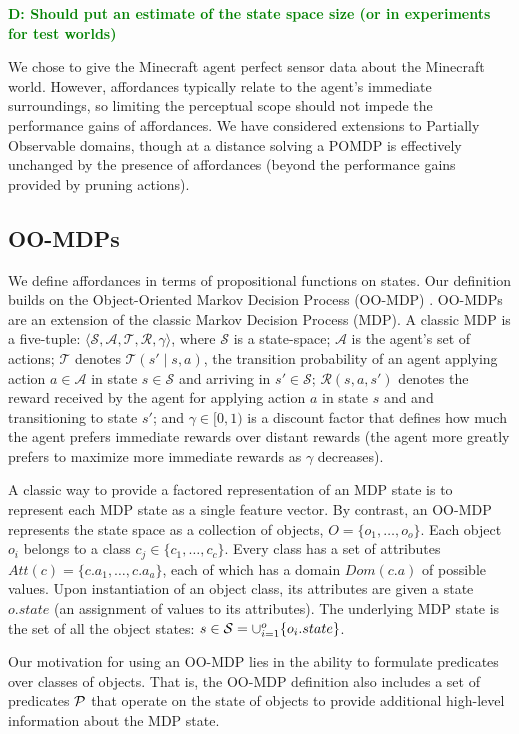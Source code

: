 \documentclass[conference]{IEEEtran}
\newcommand{\dnote}[1]{\textcolor{Green}{\textbf{D: #1}}}
\begin{document}
\dnote{Should put an estimate of the state space size (or in experiments for test worlds)}

We chose to give the Minecraft agent perfect sensor data about the Minecraft world.
However, affordances typically relate to the agent's immediate surroundings,
so limiting the perceptual scope should not impede the performance gains of affordances.
We have considered extensions to Partially Observable domains, though at a distance
solving a POMDP is effectively unchanged by the presence of affordances (beyond the
performance gains provided by pruning actions).

\subsection{OO-MDPs}

We define affordances in terms of propositional functions on states. Our definition builds on the Object-Oriented Markov Decision Process
(OO-MDP) \cite{diuk08}.  OO-MDPs are an extension of
the classic Markov Decision Process (MDP).  A classic MDP is a
five-tuple: $\langle \mathcal{S}, \mathcal{A}, \mathcal{T},
\mathcal{R}, \gamma \rangle$, where $\mathcal{S}$ is a state-space;
$\mathcal{A}$ is the agent's set of actions; $\mathcal{T}$ denotes
$\mathcal{T}(s' \mid s,a)$, the transition probability of an agent
applying action $a \in \mathcal{A}$ in state $s \in \mathcal{S}$ and
arriving in $s' \in \mathcal{S}$; $\mathcal{R}(s,a,s')$ denotes the
reward received by the agent for applying action $a$ in state $s$ and
and transitioning to state $s'$; and $\gamma \in [0, 1)$ is a discount
  factor that defines how much the agent prefers immediate rewards
  over distant rewards (the agent more greatly prefers to maximize
  more immediate rewards as $\gamma$ decreases).

A classic way to provide a factored representation of an MDP state is to represent
each MDP state as a single feature vector. By contrast, an OO-MDP represents the state space as a collection of objects,
$O = \{o_1, \ldots, o_o \}$.  Each object $o_i$ belongs to a
class $c_j \in  \{c_1, \ldots, c_c\}$. Every class has a set of attributes
$Att(c) = \{c.a_1, \ldots, c.a_a \}$, each of which has a domain $Dom(c.a)$ of possible values.
Upon instantiation of an object class, its attributes are given a state $o.state$
(an assignment of values to its attributes).  The underlying MDP state is the set
of all the object states: $s \in {\cal S} = \cup_{i = 1}^o \{o_i.state\}$. 

Our motivation for using an OO-MDP lies in the ability to
formulate predicates over classes of objects. That is, the OO-MDP
definition also includes a set of predicates ${\cal P}$ that operate
on the state of objects to provide additional high-level information
about the MDP state. 
\end{document}
